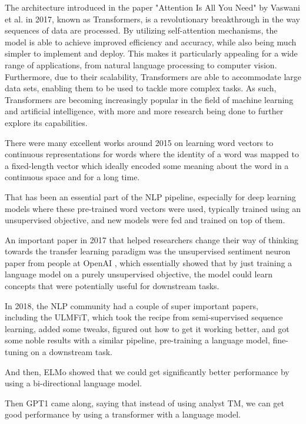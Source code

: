 The architecture introduced in the paper "Attention Is All You Need" by Vaswani et al. in 2017\cite{https://doi.org/10.48550/arxiv.1706.03762}, known as Transformers, is a revolutionary breakthrough in the way sequences of data are processed. By utilizing self-attention mechanisms, the model is able to achieve improved efficiency and accuracy, while also being much simpler to implement and deploy. This makes it particularly appealing for a wide range of applications, from natural language processing to computer vision. Furthermore, due to their scalability, Transformers are able to accommodate large data sets, enabling them to be used to tackle more complex tasks. As such, Transformers are becoming increasingly popular in the field of machine learning and artificial intelligence, with more and more research being done to further explore its capabilities.

There were many excellent works around 2015 on learning word vectors to continuous representations for words where the identity of a word was mapped to a fixed-length vector which ideally encoded some meaning about the word in a continuous space and for a long time.

That has been an essential part of the NLP pipeline, especially for deep learning models where these pre-trained word vectors were used, typically trained using an unsupervised objective, and new models were fed and trained on top of them.

An important paper in 2017 that helped researchers change their way of thinking towards the transfer learning paradigm was the unsupervised sentiment neuron paper from people at OpenAI \cite{DBLP:journals/corr/RadfordJS17}, which essentially showed that by just training a language model on a purely unsupervised objective, the model could learn concepts that were potentially useful for downstream tasks.

In 2018, the NLP community had a couple of super important papers, \\
including the ULMFiT\cite{ELMo}, which took the recipe from semi-supervised sequence learning, added some tweaks, figured out how to get it working better, and got some noble results with a similar pipeline, pre-training a language model, fine-tuning on a downstream task.

And then, ELMo\cite{ELMo} showed that we could get significantly better performance by using a bi-directional language model.

Then GPT1 \cite{Radford2018ImprovingLU} came along, saying that instead of using analyst TM, we can get good performance by using a transformer with a language model.

